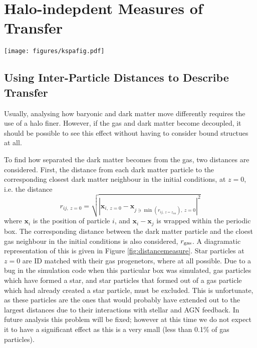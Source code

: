 \section{Halo-indepdent Measures of Transfer}
\label{sec:haloindependent}

\begin{figure*} \centering
	\texttt{[image: figures/kspafig.pdf]} \caption{A
	diagramatic representation of the distance measure. On the left, the
	initial conditions are shown. The blue dark matter particles each find
	their closest dark matter and gas (red) neighbour. These particles are
	then tracked to the final state of the simulation (right) and the
	distances between them calculated again.} \label{fig:distancemeasure}
\end{figure*}

\subsection{Using Inter-Particle Distances to Describe Transfer}

Usually, analysing how baryonic and dark matter move differently requires the
use of a halo finer. However, if the gas and dark matter become decoupled, it
should be possible to see this effect without having to consider bound
structues at all.

To find how separated the dark matter becomes from the gas, two distances are
considered. First, the distance from each dark matter particle to the
corresponding closest dark matter neighbour in the initial conditions, at
$z=0$, i.e. the distance \begin{equation} r_{ij, ~z=0} = \sqrt{ \left|
\mathbf{x}_{i, ~z=0} - \mathbf{x}_{j \ni \min(r_{ij, ~z=z_{ini}}), ~z=0}
\right|^2 } \label{eqn:minimal} \end{equation} where $\mathbf{x}_i$ is the
position of particle $i$, and $\mathbf{x}_i - \mathbf{x}_j$ is wrapped within
the periodic box. The corresponding distance between the dark matter particle
and the cloest gas neighbour in the initial conditions is also considered,
$r_{\rm gas}$. A diagramatic representation of this is given in Figure
\ref{fig:distancemeasure}. Star particles at $z=0$ are ID matched with their
gas progenetors, where at all possible. Due to a bug in the simulation code
when this particular box was simulated, gas particles which have formed a star,
and star particles that formed out of a gas particle which had already created
a star particle, must be excluded. This is unfortunate, as these particles
are the ones that would probably have extended out to the largest distances
due to their interactions with stellar and AGN feedback. In future analysis this
problem will be fixed; however at this time we do not expect it to have a
significant effect as this is a very small (less than 0.1\% of gas particles).


